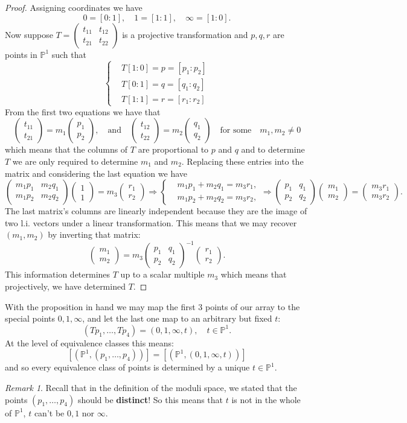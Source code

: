 \documentclass[11pt]{article}
\newcommand{\bP}{\mathbb{P}}
\newcommand{\To}{\Rightarrow}           %
\newcommand{\twobyone}[2]{\begin{pmatrix} %
    #1 \\ #2 \end{pmatrix}}
\newcommand{\twobytwo}[4]{\begin{pmatrix} %
    #1 & #2 \\ #3 & #4 \end{pmatrix}}
\theoremstyle{definition}
\theoremstyle{remark}
\newtheorem{Rmk}[Th]{Remark}      %
\numberwithin{theorem}{section}
\begin{document}
\begin{proof}
    Assigning coordinates we have 
    $$0=[0:1],\quad 1=[1:1],\quad \infty=[1:0].$$
    Now suppose $T=\twobytwo{t_{11}}{t_{12}}{t_{21}}{t_{22}}$ is a projective transformation and $p,q,r$ are points in $\bP^1$ such that
    $$
    \left\lbrace
    \begin{aligned}
        &T[1:0]=p=[p_1:p_2]\\
        &T[0:1]=q=[q_1:q_2]\\
        &T[1:1]=r=[r_1:r_2]
    \end{aligned}
    \right.
    $$
    From the first two equations we have that 
    $$\twobyone{t_{11}}{t_{21}}=m_1\twobyone{p_1}{p_2},\quad\text{and}\quad\twobyone{t_{12}}{t_{22}}=m_2\twobyone{q_1}{q_2}\quad\text{for some}\quad m_1,m_2\neq 0$$
    which means that the columns of $T$ are proportional to $p$ and $q$ and to determine $T$ we are only required to determine $m_1$ and $m_2$. Replacing these entries into the matrix and considering the last equation we have 
    $$\twobytwo{m_1p_1}{m_2q_1}{m_1p_2}{m_2q_2}\twobyone{1}{1}=m_3\twobyone{r_1}{r_2}\To \left\lbrace
    \begin{aligned}
        &m_1p_1+m_2q_1=m_3r_1,\\
        &m_1p_2+m_2q_2=m_3r_2,
    \end{aligned}
    \right.\To \twobytwo{p_1}{q_1}{p_2}{q_2}\twobyone{m_1}{m_2}=\twobyone{m_3r_1}{m_3r_2}.$$
    The last matrix's columns are linearly independent because they are the image of two l.i. vectors under a linear transformation. This means that we may recover $(m_1,m_2)$ by inverting that matrix:
    $$\twobyone{m_1}{m_2}=m_3\twobytwo{p_1}{q_1}{p_2}{q_2}^{-1}\twobyone{r_1}{r_2}.$$
    This information determines $T$ up to a scalar multiple $m_3$ which means that projectively, we have determined $T$.
\end{proof}

With the proposition in hand we may map the first $3$ points of our array to the special points $0,1,\infty$, and let the last one map to an arbitrary but fixed $t$:
$$(Tp_1,\dots,Tp_4)=(0,1,\infty,t),\quad t\in\bP^1.$$
At the level of equivalence classes this means:
$$[(\bP^1,(p_1,\dots,p_4))]=[(\bP^1,(0,1,\infty,t))]$$
and so every equivalence class of points is determined by a unique $t\in\bP^1$.

\begin{Rmk}
Recall that in the definition of the moduli space, we stated that the points $(p_1,\dots,p_4)$ should be \textbf{distinct}! So this means that $t$ is not in the whole of $\bP^1$, $t$ can't be $0,1$ nor $\infty$. 
\end{Rmk}
\end{document}
